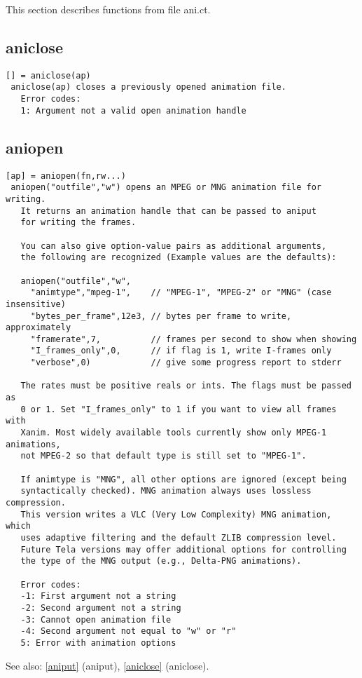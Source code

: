\documentclass[a4paper]{article}
\begin{document}
This section describes functions from file ani.ct.




\subsection{aniclose\label{aniclose}}

\begin{tscreen}
\begin{verbatim}
[] = aniclose(ap)
 aniclose(ap) closes a previously opened animation file.
   Error codes:
   1: Argument not a valid open animation handle
\end{verbatim}
\end{tscreen}



\subsection{aniopen\label{aniopen}}

\begin{tscreen}
\begin{verbatim}
[ap] = aniopen(fn,rw...)
 aniopen("outfile","w") opens an MPEG or MNG animation file for writing.
   It returns an animation handle that can be passed to aniput
   for writing the frames.

   You can also give option-value pairs as additional arguments,
   the following are recognized (Example values are the defaults):

   aniopen("outfile","w",
     "animtype","mpeg-1",    // "MPEG-1", "MPEG-2" or "MNG" (case insensitive)
     "bytes_per_frame",12e3, // bytes per frame to write, approximately
     "framerate",7,          // frames per second to show when showing
     "I_frames_only",0,      // if flag is 1, write I-frames only
     "verbose",0)            // give some progress report to stderr

   The rates must be positive reals or ints. The flags must be passed as
   0 or 1. Set "I_frames_only" to 1 if you want to view all frames with
   Xanim. Most widely available tools currently show only MPEG-1 animations,
   not MPEG-2 so that default type is still set to "MPEG-1".

   If animtype is "MNG", all other options are ignored (except being
   syntactically checked). MNG animation always uses lossless compression.
   This version writes a VLC (Very Low Complexity) MNG animation, which
   uses adaptive filtering and the default ZLIB compression level.
   Future Tela versions may offer additional options for controlling
   the type of the MNG output (e.g., Delta-PNG animations).

   Error codes:
   -1: First argument not a string
   -2: Second argument not a string
   -3: Cannot open animation file
   -4: Second argument not equal to "w" or "r"
   5: Error with animation options
\end{verbatim}

See also: \ref{aniput} {(aniput)}, \ref{aniclose} {(aniclose)}.
\end{tscreen}
\end{document}
